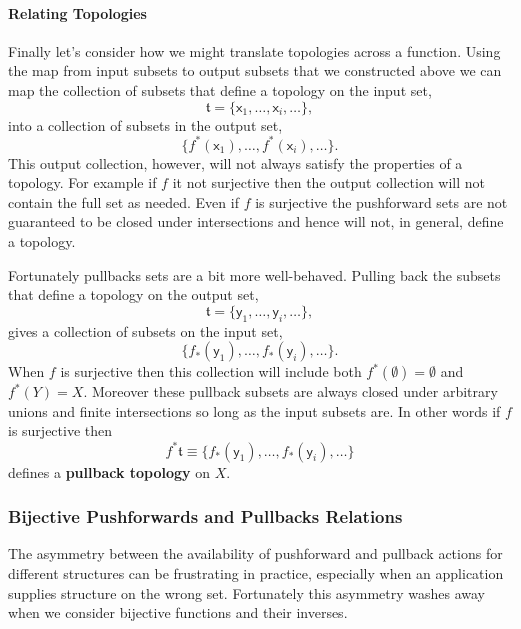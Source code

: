 \documentclass[
  letterpaper,
  DIV=11,
  numbers=noendperiod]{scrartcl}
\let\oldparagraph\paragraph
\renewcommand{\paragraph}[1]{\oldparagraph{#1}\mbox{}}
\begin{document}
\hypertarget{relating-topologies}{%
\paragraph{Relating Topologies}\label{relating-topologies}}

Finally let's consider how we might translate topologies across a
function. Using the map from input subsets to output subsets that we
constructed above we can map the collection of subsets that define a
topology on the input set, \[
\mathfrak{t} = \{ \mathsf{x}_{1}, \ldots, \mathsf{x}_{i}, \ldots \},
\] into a collection of subsets in the output set, \[
\{ f^{*}(\mathsf{x}_{1}), \ldots, f^{*}(\mathsf{x}_{i}), \ldots \}.
\] This output collection, however, will not always satisfy the
properties of a topology. For example if \(f\) it not surjective then
the output collection will not contain the full set as needed. Even if
\(f\) is surjective the pushforward sets are not guaranteed to be closed
under intersections and hence will not, in general, define a topology.

Fortunately pullbacks sets are a bit more well-behaved. Pulling back the
subsets that define a topology on the output set, \[
\mathfrak{t} = \{ \mathsf{y}_{1}, \ldots, \mathsf{y}_{i}, \ldots \},
\] gives a collection of subsets on the input set, \[
\{ f_{*}(\mathsf{y}_{1}), \ldots, f_{*}(\mathsf{y}_{i}), \ldots \}.
\] When \(f\) is surjective then this collection will include both
\(f^{*}(\emptyset) = \emptyset\) and \(f^{*}(Y) = X\). Moreover these
pullback subsets are always closed under arbitrary unions and finite
intersections so long as the input subsets are. In other words if \(f\)
is surjective then \[
f^{*} \mathfrak{t} \equiv
\{ f_{*}(\mathsf{y}_{1}), \ldots, f_{*}(\mathsf{y}_{i}), \ldots \}
\] defines a \textbf{pullback topology} on \(X\).

\hypertarget{bijective-pushforwards-and-pullbacks-relations}{%
\subsubsection{Bijective Pushforwards and Pullbacks
Relations}\label{bijective-pushforwards-and-pullbacks-relations}}

The asymmetry between the availability of pushforward and pullback
actions for different structures can be frustrating in practice,
especially when an application supplies structure on the wrong set.
Fortunately this asymmetry washes away when we consider bijective
functions and their inverses.
\end{document}
